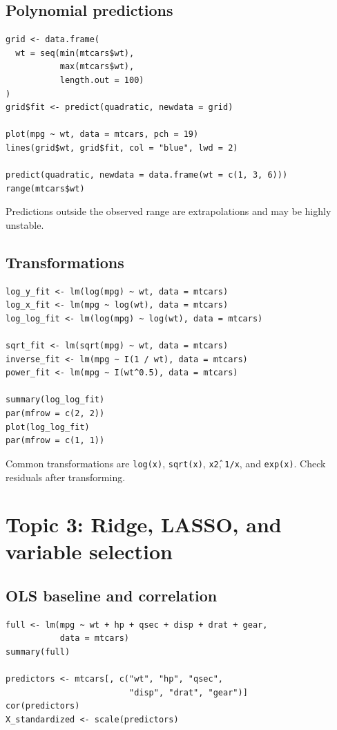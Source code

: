 \documentclass[11pt]{article}
\begin{document}
\subsection{Polynomial predictions}
\begin{lstlisting}
grid <- data.frame(
  wt = seq(min(mtcars$wt),
           max(mtcars$wt),
           length.out = 100)
)
grid$fit <- predict(quadratic, newdata = grid)

plot(mpg ~ wt, data = mtcars, pch = 19)
lines(grid$wt, grid$fit, col = "blue", lwd = 2)

predict(quadratic, newdata = data.frame(wt = c(1, 3, 6)))
range(mtcars$wt)
\end{lstlisting}

Predictions outside the observed range are extrapolations and may be highly
unstable.

\subsection{Transformations}
\begin{lstlisting}
log_y_fit <- lm(log(mpg) ~ wt, data = mtcars)
log_x_fit <- lm(mpg ~ log(wt), data = mtcars)
log_log_fit <- lm(log(mpg) ~ log(wt), data = mtcars)

sqrt_fit <- lm(sqrt(mpg) ~ wt, data = mtcars)
inverse_fit <- lm(mpg ~ I(1 / wt), data = mtcars)
power_fit <- lm(mpg ~ I(wt^0.5), data = mtcars)

summary(log_log_fit)
par(mfrow = c(2, 2))
plot(log_log_fit)
par(mfrow = c(1, 1))
\end{lstlisting}

Common transformations are \texttt{log(x)}, \texttt{sqrt(x)}, \texttt{x\^2},
\texttt{1/x}, and \texttt{exp(x)}. Check residuals after transforming.

\section{Topic 3: Ridge, LASSO, and variable selection}

\subsection{OLS baseline and correlation}
\begin{lstlisting}
full <- lm(mpg ~ wt + hp + qsec + disp + drat + gear,
           data = mtcars)
summary(full)

predictors <- mtcars[, c("wt", "hp", "qsec",
                         "disp", "drat", "gear")]
cor(predictors)
X_standardized <- scale(predictors)
\end{lstlisting}
\end{document}

